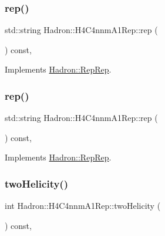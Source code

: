 \subsubsection{\texorpdfstring{rep()}{rep()}\hspace{0.1cm}{\footnotesize\ttfamily [4/5]}}
{\footnotesize\ttfamily std\+::string Hadron\+::\+H4\+C4nnm\+A1\+Rep\+::rep (\begin{DoxyParamCaption}{ }\end{DoxyParamCaption}) const\hspace{0.3cm}{\ttfamily [inline]}, {\ttfamily [virtual]}}



Implements \mbox{\hyperlink{structHadron_1_1RepRep_ab3213025f6de249f7095892109575fde}{Hadron\+::\+Rep\+Rep}}.

\mbox{\label{structHadron_1_1H4C4nnmA1Rep_a1284b0ca578df221e5280750522ab4b2}} 
\subsubsection{\texorpdfstring{rep()}{rep()}\hspace{0.1cm}{\footnotesize\ttfamily [5/5]}}
{\footnotesize\ttfamily std\+::string Hadron\+::\+H4\+C4nnm\+A1\+Rep\+::rep (\begin{DoxyParamCaption}{ }\end{DoxyParamCaption}) const\hspace{0.3cm}{\ttfamily [inline]}, {\ttfamily [virtual]}}



Implements \mbox{\hyperlink{structHadron_1_1RepRep_ab3213025f6de249f7095892109575fde}{Hadron\+::\+Rep\+Rep}}.

\mbox{\label{structHadron_1_1H4C4nnmA1Rep_a8f570a8c9ad6fc04e9458e44562b8b21}} 
\subsubsection{\texorpdfstring{twoHelicity()}{twoHelicity()}\hspace{0.1cm}{\footnotesize\ttfamily [1/3]}}
{\footnotesize\ttfamily int Hadron\+::\+H4\+C4nnm\+A1\+Rep\+::two\+Helicity (\begin{DoxyParamCaption}{ }\end{DoxyParamCaption}) const\hspace{0.3cm}{\ttfamily [inline]}, {\ttfamily [virtual]}}

